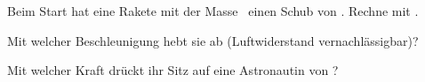 Beim Start hat eine Rakete mit der Masse \mRO\ einen Schub von \FTO. Rechne mit \gO.

\begin{abcliste}
\abc
Mit welcher Beschleunigung hebt sie ab (Luftwiderstand vernachlässigbar)?

\abc
Mit welcher Kraft drückt ihr Sitz auf eine Astronautin von \mAsO?
\end{abcliste}
